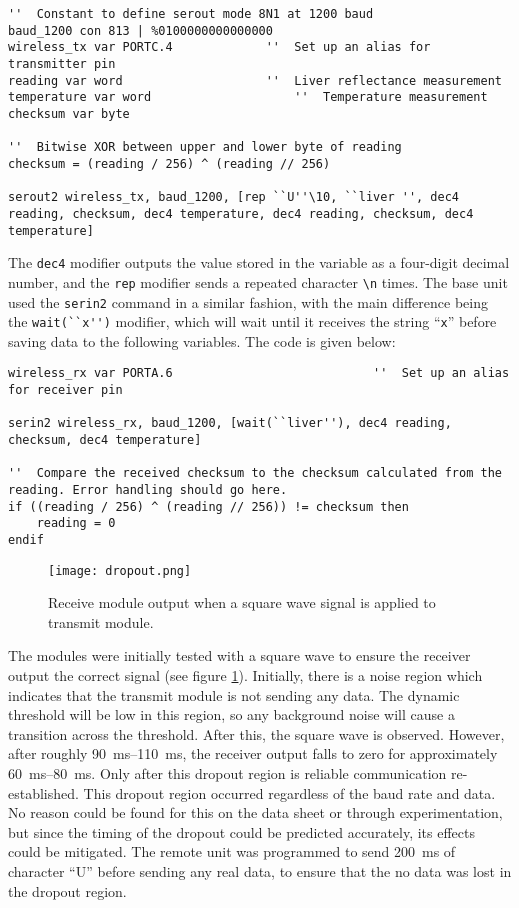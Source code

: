 \begin{lstlisting}
''  Constant to define serout mode 8N1 at 1200 baud
baud_1200 con 813 | %0100000000000000
wireless_tx var PORTC.4				''  Set up an alias for transmitter pin
reading var word 					''  Liver reflectance measurement
temperature var word					''  Temperature measurement
checksum var byte

''  Bitwise XOR between upper and lower byte of reading
checksum = (reading / 256) ^ (reading // 256)

serout2 wireless_tx, baud_1200, [rep ``U''\10, ``liver '', dec4 reading, checksum, dec4 temperature, dec4 reading, checksum, dec4 temperature]
\end{lstlisting}

The \verb|dec4| modifier outputs the value stored in the variable as a four-digit decimal number, and the \verb|rep| modifier sends a repeated character \verb|\n| times. The base unit used the \verb|serin2| command in a similar fashion, with the main difference being the \verb|wait(``x'')| modifier, which will wait until it receives the string ``\verb|x|'' before saving data to the following variables. The code is given below:

\begin{lstlisting}
wireless_rx var PORTA.6                            ''  Set up an alias for receiver pin

serin2 wireless_rx, baud_1200, [wait(``liver''), dec4 reading, checksum, dec4 temperature]

''  Compare the received checksum to the checksum calculated from the reading. Error handling should go here.
if ((reading / 256) ^ (reading // 256)) != checksum then
    reading = 0
endif
\end{lstlisting}






\begin{figure}[htb]
	\centering
	\texttt{[image: dropout.png]}
	\caption{Receive module output when a square wave signal is applied to transmit module.}
	\label{fig: dropout}
\end{figure}

The modules were initially tested with a square wave to ensure the receiver output the correct signal (see figure \ref{fig: dropout}). Initially, there is a noise region which indicates that the transmit module is not sending any data. The dynamic threshold will be low in this region, so any background noise will cause a transition across the threshold. After this, the square wave is observed. However, after roughly \SIrange{90}{110}{\milli\second}, the receiver output falls to zero for approximately \SIrange{60}{80}{\milli\second}. Only after this dropout region is reliable communication re-established. This dropout region occurred regardless of the baud rate and data. No reason could be found for this on the data sheet or through experimentation, but since the timing of the dropout could be predicted accurately, its effects could be mitigated. The remote unit was programmed to send \SI{200}{\milli\second} of character ``U'' before sending any real data, to ensure that the no data was lost in the dropout region.\\

